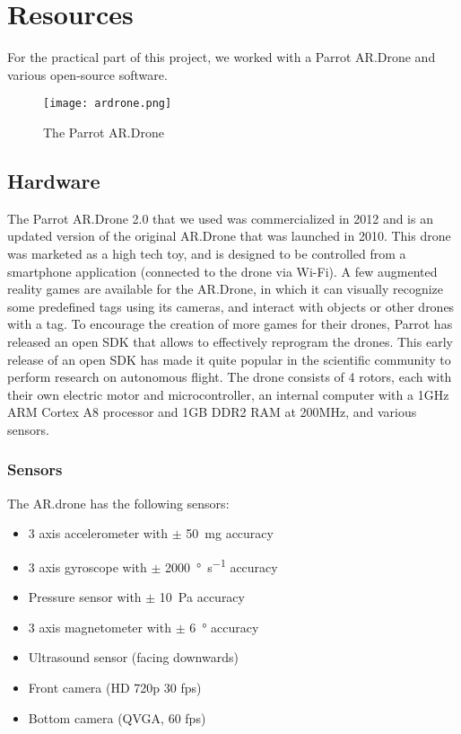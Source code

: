 \section{Resources}
For the practical part of this project, we worked with a Parrot AR.Drone and various open-source software.

\begin{figure}[H]
  \centering
  \texttt{[image: ardrone.png]}
    \caption{The Parrot AR.Drone}
    \label{fig:ardrone}
\end{figure}


\subsection{Hardware}
The Parrot AR.Drone 2.0 that we used was commercialized in 2012 and is an updated version of the original AR.Drone that was launched in 2010. This drone was marketed as a high tech toy, and is designed to be controlled from a smartphone application (connected to the drone via Wi-Fi). A few augmented reality games are available for the AR.Drone, in which it can visually recognize some predefined tags using its cameras, and interact with objects or other drones with a tag. To encourage the creation of more games for their drones, Parrot has released an open SDK that allows to effectively reprogram the drones. This early release of an open SDK has made it quite popular in the scientific community to perform research on autonomous flight. The drone consists of 4 rotors, each with their own electric motor and microcontroller, an internal computer with a 1GHz ARM Cortex A8 processor and 1GB DDR2 RAM at 200MHz, and various sensors.

\subsubsection{Sensors}
The AR.drone has the following sensors:
\begin{itemize}
  \item 3 axis accelerometer with $\pm$  \SI{50}{\milli\gram} accuracy
  \item 3 axis gyroscope with $\pm$ \SI{2000}{\degree\per\second} accuracy
  \item Pressure sensor with $\pm$ \SI{10}{\pascal} accuracy
  \item 3 axis magnetometer with $\pm$ \SI{6}{\degree} accuracy
  \item Ultrasound sensor (facing downwards)
  \item Front camera (HD 720p 30 fps)
  \item Bottom camera (QVGA, 60 fps)
\end{itemize}

